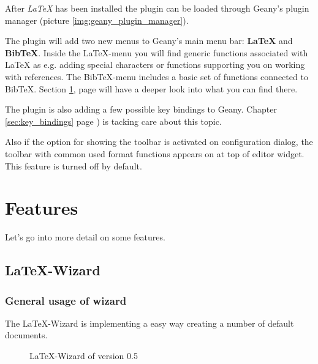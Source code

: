 \documentclass[%
paper=a4,%
fontsize=11pt,%
twoside=false,%
DIV18,%
headsepline,%
plainheadsepline,%
footsepline,%
plainfootsepline,%
bibliography=totoc,%
listof=totoc,%
BCOR10mm,%
parskip=half,%
openany,%
]{scrartcl}
\begin{document}
After \textit{LaTeX} has been installed the plugin can be loaded
through Geany's plugin manager (picture \ref{img:geany_plugin_manager}).

The plugin will add two new menus to Geany's main menu bar:
\textbf{LaTeX} and \textbf{BibTeX}. Inside the LaTeX-menu you will find
generic functions associated with \LaTeX{} as e.g. adding special
characters or functions supporting you on working with references. The
BibTeX-menu includes a basic set of functions connected to BibTeX.
Section \ref{sec:features}, page \pageref{sec:features} will have a
deeper look into what you can find there.

The plugin is also adding a few possible key bindings to Geany. Chapter
\ref{sec:key_bindings} page \pageref{sec:key_bindings}) is tacking care
about this topic.

Also if the option for showing the toolbar is activated on configuration
dialog, the toolbar with common used format functions appears on at top
of editor widget. This feature is turned off by default.


\section{Features}
\label{sec:features}
Let's go into more detail on some features.


\subsection{\LaTeX-Wizard}

\subsubsection{General usage of wizard}
The \LaTeX-Wizard is implementing a easy way creating a number of
default documents.
\begin{figure}[h!]
	\caption{\LaTeX-Wizard of version 0.5}
\end{figure}
\end{document}
